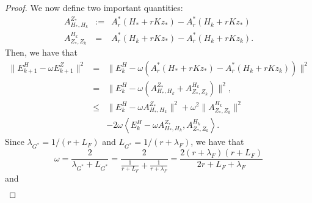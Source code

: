 \begin{proof}
\begin{comment}
&=& H_* - H_k - \omega [ X_* - X_{k+1} - (Kz_* - K z_{k+1}) ] \\  
&=& H_* - H_k - \omega [ A_r^{*} (H_* + r K z_*) - A_r^{*} (H_k + r K z_k) \\
&& - P_Z [ A_r^{*} (H_* + rK z_*) - A_r^{*} (H_k + rK z_k) ] ] \\
&=& H_* - H_k - \omega Q_Z (A_r^{*} (H_* + r K z_*) - A_r^{*} (H_k + r K z_k)) \\ 
&=& Q_Z [H_* - H_k - \omega (A_r^{*} (H_* + r K z_*) - A_r^{*} (H_k + r K z_k))] 
\end{eqnarray*}
Thus, we have that 
\begin{eqnarray*}
H_{*} - H_{k+1} - \omega (Kz_* - K z_{k+1}) = H_* - H_k - \omega (A_r^{*} (H_* + r K z_*) - A_r^{*} (H_k + r K z_k)). 
\end{eqnarray*}
\end{comment} 
We now define two important quantities: 
\begin{eqnarray}
A_{H_*,H_k}^{Z_*} &:=& A_r^{*} (H_* + rK z_*) - A_r^*(H_k + rKz_*) \\ 
A_{Z_*,Z_k}^{H_k} &=& A_r^*(H_k + rKz_*) - A_r^*(H_k + rKz_k). 
\end{eqnarray}
Then, we have that  
\begin{eqnarray*}
\|E_{k+1}^H - \omega E_{k+1}^Z\|^2 &=& \|E_k^H - \omega (A_r^{*} (H_* + r K z_*) - A_r^{*} (H_k + r K z_k))\|^2 \\ 
&=& \|E_k^H - \omega (A_{H_*,H_k}^{Z_*} + A_{Z_*,Z_k}^{H_k})\|^2,  \\
&\leq& \|E_k^H - \omega A_{H_*,H_k}^{Z_*}\|^2 + \omega^2 \|A_{Z_*,Z_k}^{H_k}\|^2 \\
&& -2 \omega \left \langle E_k^H - \omega A_{H_*,H_k}^{Z_*}, A_{Z_*,Z_k}^{H_k} \right \rangle.  
\end{eqnarray*}
Since $\lambda_{G^*} = 1/(r + L_F)$ and $L_{G^*} = 1/(r + \lambda_F)$, we have that 
\begin{equation}
\omega = \frac{2}{\lambda_{G^*} + L_{G^*}} = \frac{2}{\frac{1}{r + L_F} + \frac{1}{r + \lambda_F}} = \frac{2 (r + \lambda_F)(r + L_F)}{2r + L_F + \lambda_F}  
\end{equation} 
and 
\begin{eqnarray*}

\end{eqnarray*}
\end{proof}
